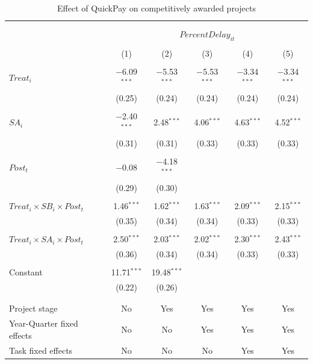 \documentclass[
]{article}
\begin{document}
\begin{table}[H] \centering 
  \caption{Effect of QuickPay on competitively awarded projects} 
  \label{} 
\small 
\begin{tabular}{@{\extracolsep{-2pt}}lccccc} 
\\[-1.8ex]\hline 
\hline \\[-1.8ex] 
\\[-1.8ex] & \multicolumn{5}{c}{$PercentDelay_{it}$  } \\ 
\\[-1.8ex] & (1) & (2) & (3) & (4) & (5)\\ 
\hline \\[-1.8ex] 
 $Treat_i$ & $-$6.09$^{***}$ & $-$5.53$^{***}$ & $-$5.53$^{***}$ & $-$3.34$^{***}$ & $-$3.34$^{***}$ \\ 
  & (0.25) & (0.24) & (0.24) & (0.24) & (0.24) \\ 
  & & & & & \\ 
 $SA_i$ & $-$2.40$^{***}$ & 2.48$^{***}$ & 4.06$^{***}$ & 4.63$^{***}$ & 4.52$^{***}$ \\ 
  & (0.31) & (0.31) & (0.33) & (0.33) & (0.33) \\ 
  & & & & & \\ 
 $Post_t$ & $-$0.08 & $-$4.18$^{***}$ &  &  &  \\ 
  & (0.29) & (0.30) &  &  &  \\ 
  & & & & & \\ 
 $Treat_i \times SB_i \times Post_t$ & 1.46$^{***}$ & 1.62$^{***}$ & 1.63$^{***}$ & 2.09$^{***}$ & 2.15$^{***}$ \\ 
  & (0.35) & (0.34) & (0.34) & (0.33) & (0.33) \\ 
  & & & & & \\ 
 $Treat_i \times SA_i \times Post_t$ & 2.50$^{***}$ & 2.03$^{***}$ & 2.02$^{***}$ & 2.30$^{***}$ & 2.43$^{***}$ \\ 
  & (0.36) & (0.34) & (0.34) & (0.33) & (0.33) \\ 
  & & & & & \\ 
 Constant & 11.71$^{***}$ & 19.48$^{***}$ &  &  &  \\ 
  & (0.22) & (0.26) &  &  &  \\ 
  & & & & & \\ 
\hline \\[-1.8ex] 
Project stage & No & Yes & Yes & Yes & Yes \\ 
Year-Quarter fixed effects & No & No & Yes & Yes & Yes \\ 
Task fixed effects & No & No & No & Yes & Yes \\ 

\end{tabular}
\end{table}
\end{document}
